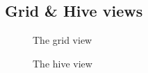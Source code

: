 
	\subsection{Grid \& Hive views} %
	\label{sec:grid_&_hive_views}

\begin{figure}[ht]
\centering
\caption{The grid view}
\label{fig:grid}
\end{figure}

\begin{figure}[ht]
\centering
\caption{The hive view}
\label{fig:hive}
\end{figure}
	

